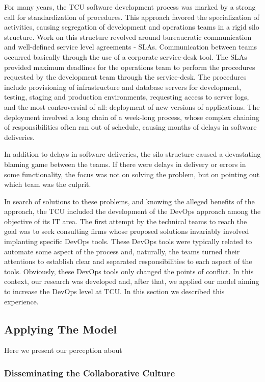 {
\color{blue}
For many years, the TCU software development process was marked by a strong call
for standardization of procedures. This approach favored the specialization of
activities, causing segregation of development and operations teams in a rigid
silo structure. Work on this structure revolved around bureaucratic
communication and well-defined service level agreements - SLAs. Communication
between teams occurred basically through the use of a corporate service-desk tool.
The SLAs provided maximum deadlines for the operations team to perform the
procedures requested by the development team through the service-desk. The
procedures include provisioning of infrastructure and database servers for
development, testing, staging and production environments, requesting access
to server logs, and the most controversial of all: deployment of new versions
of applications. The deployment involved a long chain of a week-long process,
whose complex chaining of responsibilities often ran out of schedule, causing
months of delays in software deliveries.

In addition to delays in software deliveries, the silo structure caused a
devastating blaming game between the teams. If there were delays in delivery
or errors in some functionality, the focus was not on solving the problem, but
on pointing out which team was the culprit.

In search of solutions to these problems, and knowing the alleged benefits of
the approach, the TCU included the development of the DevOps approach among the
objective of its IT area. The first attempt by the technical teams to reach the
goal was to seek consulting firms whose proposed solutions invariably involved
implanting specific DevOps tools. These DevOps tools were typically related to
automate some aspect of the process and, naturally, the teams turned their
attentions to establish clear and separated responsibilities to each aspect of
the tools. Obviously, these DevOps tools only changed the points of conflict.
In this context, our research was developed and, after that, we applied our
model aiming to increase the DevOps level at TCU. In this section we described
this experience.
}

\subsection{Applying The Model}

Here we present our perception about

\subsubsection{Disseminating the Collaborative Culture}


